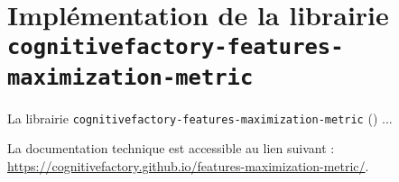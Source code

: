\section{Implémentation de la librairie \\ \texttt{cognitivefactory-features-maximization-metric}}
\label{annex:C.2-DESCRIPTION-IMPLEMENTATION-FEATURES-MAXIMIZATION-METRIC}
	
	La librairie \texttt{cognitivefactory-features-maximization-metric} (\cite{schild:2023:cognitivefactory-featuresmaximizationmetric}) ...
	
	\begin{leftBarInformation}
		La documentation technique est accessible au lien suivant : \url{https://cognitivefactory.github.io/features-maximization-metric/}.
	\end{leftBarInformation}